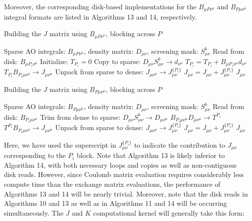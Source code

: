 \noindent Moreover, the corresponding disk-based implementations for the $B_{\mu P \nu^\mu}$ and $B_{P \mu \nu^\mu}$ integral
formats are listed in Algorithms 13 and 14, respectively.

\begin{algorithm}[H]
\caption{Building the $J$ matrix using $B_{\mu P \nu^\mu}$, blocking across $P$}
\begin{algorithmic}
\REQUIRE Sparse AO integrals: $B_{\mu P \nu^{\mu}}$, density matrix: $D_{\mu \nu}$, screening mask: $S_{\mu \nu}^b$
    \STATE Read from disk: $B_{\mu P_i \nu^{\mu}}$
    \STATE Initialize: $T_{P_i} = 0$
        \STATE Copy to sparse: $D_{\mu \nu}S_{\mu \nu}^b \rightarrow d_{\nu^{\mu} }$
        \STATE $T_{P_i} = T_{P_i} + B_{\mu P_i \nu^{\mu}}d_{\nu^{\mu}}$
    \ENDFOR    
    \STATE $T_{P_i} B_{P_i \mu \nu^{\mu}} \rightarrow J_{\mu \nu^{\mu}} $
    \STATE Unpack from sparse to dense: $J_{\mu \nu^{\mu}} \rightarrow J_{\mu \nu}^{\{P_i\}}$
    \STATE $J_{\mu \nu} = J_{\mu \nu} + J_{\mu \nu}^{\{P_i\}}$
\ENDFOR
\RETURN $J_{\mu \nu}$
\end{algorithmic}
\end{algorithm}

\begin{algorithm}[H]
\caption{Building the $J$ matrix using $B_{P \mu \nu^\mu}$, blocking across $P$}
\begin{algorithmic}
\REQUIRE Sparse AO integrals: $B_{P \mu \nu^{\mu}}$, density matrix: $D_{\mu \nu}$, screening mask: $S_{\mu \nu}^b$
    \STATE Read from disk: $B_{P_i \mu \nu^{\mu}}$
    \STATE Trim from dense to sparse: $D_{\mu \nu}S_{\mu \nu}^b \rightarrow D_{\mu \nu^{\mu} }$
    \STATE $B_{P_i \mu\nu^{\mu}} D_{\mu \nu^{\mu}} \rightarrow T^{P_i}$
    \STATE $T^{P_i} B_{P_i \mu \nu^{\mu}} \rightarrow J_{\mu \nu^{\mu}} $
    \STATE Unpack from sparse to dense: $J_{\mu \nu^{\mu}} \rightarrow J_{\mu \nu}^{\{P_i\}}$
    \STATE $J_{\mu \nu} = J_{\mu \nu} + J_{\mu \nu}^{\{P_i\}}$
\ENDFOR
\RETURN $J_{\mu \nu}$
\end{algorithmic}
\end{algorithm}

\noindent Here, we have used the superscript in $J_{\mu \nu}^{\{P_i\}}$ to indicate the contribution to 
$J_{\mu \nu}$ corresponding to the $P_i$ block.
Note that Algorithm 13 is likely inferior to Algorithm 14, with both necessary loops and copies as well as non-contiguous disk reads.
However, since Coulomb matrix evaluation requires considerably less compute time than the exchange matrix evaluations, 
the performance of Algorithms 13 and 14 will be nearly trivial. Moreover, note that the disk reads in Algorithms 10 and 13 as well as 
in Algorithms 11 and 14 will be occurring simultaneously. The $J$ and $K$ computational kernel will generally take this form:

